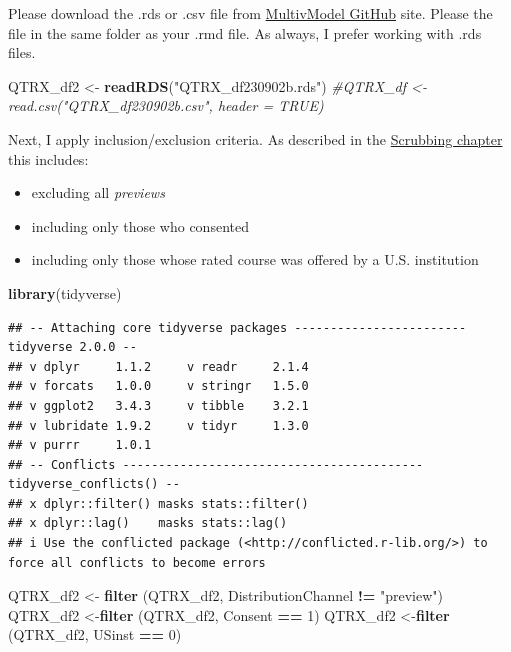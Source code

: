 \documentclass[
  11pt,
]{book}
\newenvironment{Shaded}{\begin{snugshade}}{\end{snugshade}}
\newcommand{\CommentTok}[1]{\textcolor[rgb]{0.37,0.37,0.37}{\textit{#1}}}
\newcommand{\DecValTok}[1]{\textcolor[rgb]{0.06,0.06,0.06}{#1}}
\newcommand{\FunctionTok}[1]{\textcolor[rgb]{0.27,0.27,0.27}{\textbf{#1}}}
\newcommand{\NormalTok}[1]{#1}
\newcommand{\OtherTok}[1]{\textcolor[rgb]{0.37,0.37,0.37}{#1}}
\newcommand{\SpecialCharTok}[1]{\textcolor[rgb]{0.43,0.43,0.43}{\textbf{#1}}}
\newcommand{\StringTok}[1]{\textcolor[rgb]{0.5,0.5,0.5}{#1}}
\providecommand{\tightlist}{%
  \setlength{\itemsep}{0pt}\setlength{\parskip}{0pt}}
\begin{document}
Please download the .rds or .csv file from \href{https://github.com/lhbikos/ReC_MultivModel}{MultivModel GitHub} site. Please the file in the same folder as your .rmd file. As always, I prefer working with .rds files.

\begin{Shaded}
\begin{Highlighting}[]
\NormalTok{QTRX\_df2 }\OtherTok{\textless{}{-}} \FunctionTok{readRDS}\NormalTok{(}\StringTok{"QTRX\_df230902b.rds"}\NormalTok{)}
\CommentTok{\#QTRX\_df \textless{}{-} read.csv("QTRX\_df230902b.csv", header = TRUE)}
\end{Highlighting}
\end{Shaded}

Next, I apply inclusion/exclusion criteria. As described in the \protect\hyperlink{scrub}{Scrubbing chapter} this includes:

\begin{itemize}
\tightlist
\item
  excluding all \emph{previews}
\item
  including only those who consented
\item
  including only those whose rated course was offered by a U.S. institution
\end{itemize}

\begin{Shaded}
\begin{Highlighting}[]
\FunctionTok{library}\NormalTok{(tidyverse)}
\end{Highlighting}
\end{Shaded}

\begin{verbatim}
## -- Attaching core tidyverse packages ------------------------ tidyverse 2.0.0 --
## v dplyr     1.1.2     v readr     2.1.4
## v forcats   1.0.0     v stringr   1.5.0
## v ggplot2   3.4.3     v tibble    3.2.1
## v lubridate 1.9.2     v tidyr     1.3.0
## v purrr     1.0.1     
## -- Conflicts ------------------------------------------ tidyverse_conflicts() --
## x dplyr::filter() masks stats::filter()
## x dplyr::lag()    masks stats::lag()
## i Use the conflicted package (<http://conflicted.r-lib.org/>) to force all conflicts to become errors
\end{verbatim}

\begin{Shaded}
\begin{Highlighting}[]
\NormalTok{QTRX\_df2 }\OtherTok{\textless{}{-}} \FunctionTok{filter}\NormalTok{ (QTRX\_df2, DistributionChannel }\SpecialCharTok{!=} \StringTok{"preview"}\NormalTok{)}
\NormalTok{QTRX\_df2 }\OtherTok{\textless{}{-}}\FunctionTok{filter}\NormalTok{ (QTRX\_df2, Consent }\SpecialCharTok{==} \DecValTok{1}\NormalTok{)}
\NormalTok{QTRX\_df2 }\OtherTok{\textless{}{-}}\FunctionTok{filter}\NormalTok{ (QTRX\_df2, USinst }\SpecialCharTok{==} \DecValTok{0}\NormalTok{)}
\end{Highlighting}
\end{Shaded}
\end{document}
